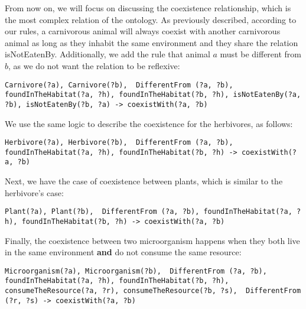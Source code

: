 From now on, we will focus on discussing the coexistence relationship, which is the most complex relation of the ontology. As previously described, according to our rules, a carnivorous animal will always coexist with another carnivorous animal as long as they inhabit the same environment and they share the relation isNotEatenBy. Additionally, we add the rule that animal $a$ must be different from $b$, as we do not want the relation to be reflexive:


\begin{lstlisting}[frame=single,breaklines=true]
Carnivore(?a), Carnivore(?b),  DifferentFrom (?a, ?b), foundInTheHabitat(?a, ?h), foundInTheHabitat(?b, ?h), isNotEatenBy(?a, ?b), isNotEatenBy(?b, ?a) -> coexistWith(?a, ?b)
\end{lstlisting}

We use the same logic to describe the coexistence for the herbivores, as follows:
\bigskip

\begin{lstlisting}[frame=single,breaklines=true]
Herbivore(?a), Herbivore(?b),  DifferentFrom (?a, ?b), foundInTheHabitat(?a, ?h), foundInTheHabitat(?b, ?h) -> coexistWith(?a, ?b)
\end{lstlisting}

Next, we have the case of coexistence between plants, which is similar to the herbivore's case:
\bigskip

\begin{lstlisting}[frame=single,breaklines=true]
Plant(?a), Plant(?b),  DifferentFrom (?a, ?b), foundInTheHabitat(?a, ?h), foundInTheHabitat(?b, ?h) -> coexistWith(?a, ?b)
\end{lstlisting}

Finally, the coexistence between two microorganism happens when they both live in the same environment \textbf{and} do not consume the same resource: 
\bigskip

\begin{lstlisting}[frame=single,breaklines=true]
Microorganism(?a), Microorganism(?b),  DifferentFrom (?a, ?b), foundInTheHabitat(?a, ?h), foundInTheHabitat(?b, ?h), consumeTheResource(?a, ?r), consumeTheResource(?b, ?s),  DifferentFrom (?r, ?s) -> coexistWith(?a, ?b)
\end{lstlisting}